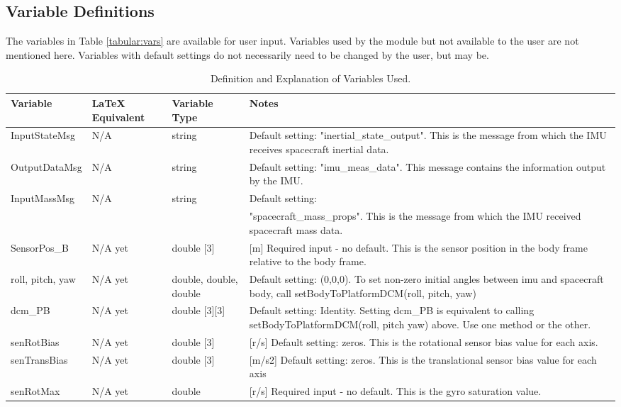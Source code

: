 \documentclass[]{BasiliskReportMemo}
\begin{document}
\subsection{Variable Definitions}
The variables in Table \ref{tabular:vars} are available for user input. Variables used by the module but not available to the user are not mentioned here. Variables with default settings do not necessarily need to be changed by the user, but may be.
\begin{table}[H]
	\caption{Definition and Explanation of Variables Used.}
	\label{tab:errortol}
	\centering \fontsize{10}{10}\selectfont
	\begin{tabular}{ | m{3cm}| m{3cm} | m{3cm} | m{6cm} |} %
		\hline
		\textbf{Variable}   							& \textbf{LaTeX Equivalent} 	&		\textbf{Variable Type} & \textbf{Notes}			  \\ \hline
		InputStateMsg&N/A		   & string & Default setting: "inertial\_state\_output". This is the message from which the IMU receives spacecraft inertial data.\\ \hline
		OutputDataMsg & N/A & string & Default setting: "imu\_meas\_data". This message contains the information output by the IMU. \\ \hline
		InputMassMsg & N/A & string & Default setting: \\&&&"spacecraft\_mass\_props". This is the message from which the IMU received spacecraft mass data. \\ \hline
		SensorPos\_B & N/A yet & double [3] & [m] Required input - no default. This is the sensor position in the body frame relative to the body frame.\\ \hline
		roll, pitch, yaw & N/A yet & double, double, double& Default setting: (0,0,0). To set non-zero initial angles between imu and spacecraft body, call setBodyToPlatformDCM(roll, pitch, yaw) \\ \hline
		dcm\_PB & N/A yet & double [3][3] & Default setting: Identity. Setting dcm\_PB is equivalent to calling setBodyToPlatformDCM(roll, pitch yaw) above. Use one method or the other. \\ \hline
		senRotBias & N/A yet & double [3] & [r/s] Default setting: zeros. This is the rotational sensor bias value for each axis. \\ \hline
		senTransBias & N/A yet & double [3] & [m/s2] Default setting: zeros. This is the translational sensor bias value for each axis \\ \hline
		senRotMax & N/A yet & double & [r/s] Required input - no default. This is the gyro saturation value. \\ \hline

\end{tabular}
\end{table}
\end{document}
